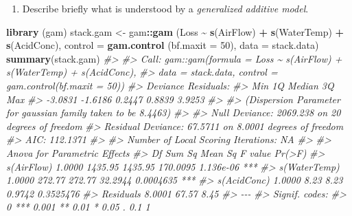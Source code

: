 \documentclass[
]{book}
\newenvironment{Shaded}{\begin{snugshade}}{\end{snugshade}}
\newcommand{\AttributeTok}[1]{\textcolor[rgb]{0.13,0.29,0.53}{#1}}
\newcommand{\CommentTok}[1]{\textcolor[rgb]{0.56,0.35,0.01}{\textit{#1}}}
\newcommand{\DecValTok}[1]{\textcolor[rgb]{0.00,0.00,0.81}{#1}}
\newcommand{\FunctionTok}[1]{\textcolor[rgb]{0.13,0.29,0.53}{\textbf{#1}}}
\newcommand{\NormalTok}[1]{#1}
\newcommand{\OtherTok}[1]{\textcolor[rgb]{0.56,0.35,0.01}{#1}}
\newcommand{\SpecialCharTok}[1]{\textcolor[rgb]{0.81,0.36,0.00}{\textbf{#1}}}
\providecommand{\tightlist}{%
  \setlength{\itemsep}{0pt}\setlength{\parskip}{0pt}}
\begin{document}
\begin{enumerate}
\def\labelenumi{(\alph{enumi})}
\tightlist
\item
  Describe briefly what is understood by a \emph{{generalized additive model}}.
\end{enumerate}

\begin{Shaded}
\begin{Highlighting}[]
\FunctionTok{library}\NormalTok{ (gam) }
\NormalTok{stack.gam }\OtherTok{\textless{}{-}}\NormalTok{ gam}\SpecialCharTok{::}\FunctionTok{gam}\NormalTok{ (Loss }\SpecialCharTok{\textasciitilde{}} \FunctionTok{s}\NormalTok{(AirFlow) }\SpecialCharTok{+} \FunctionTok{s}\NormalTok{(WaterTemp) }\SpecialCharTok{+} \FunctionTok{s}\NormalTok{(AcidConc),}
                       \AttributeTok{control =} \FunctionTok{gam.control}\NormalTok{ (}\AttributeTok{bf.maxit =} \DecValTok{50}\NormalTok{), }\AttributeTok{data =}\NormalTok{ stack.data)}
\FunctionTok{summary}\NormalTok{(stack.gam)}
\CommentTok{\#\textgreater{} }
\CommentTok{\#\textgreater{} Call: gam::gam(formula = Loss \textasciitilde{} s(AirFlow) + s(WaterTemp) + s(AcidConc), }
\CommentTok{\#\textgreater{}     data = stack.data, control = gam.control(bf.maxit = 50))}
\CommentTok{\#\textgreater{} Deviance Residuals:}
\CommentTok{\#\textgreater{}     Min      1Q  Median      3Q     Max }
\CommentTok{\#\textgreater{} {-}3.0831 {-}1.6186  0.2447  0.8839  3.9253 }
\CommentTok{\#\textgreater{} }
\CommentTok{\#\textgreater{} (Dispersion Parameter for gaussian family taken to be 8.4463)}
\CommentTok{\#\textgreater{} }
\CommentTok{\#\textgreater{}     Null Deviance: 2069.238 on 20 degrees of freedom}
\CommentTok{\#\textgreater{} Residual Deviance: 67.5711 on 8.0001 degrees of freedom}
\CommentTok{\#\textgreater{} AIC: 112.1371 }
\CommentTok{\#\textgreater{} }
\CommentTok{\#\textgreater{} Number of Local Scoring Iterations: NA }
\CommentTok{\#\textgreater{} }
\CommentTok{\#\textgreater{} Anova for Parametric Effects}
\CommentTok{\#\textgreater{}                  Df  Sum Sq Mean Sq  F value    Pr(\textgreater{}F)    }
\CommentTok{\#\textgreater{} s(AirFlow)   1.0000 1435.95 1435.95 170.0095 1.136e{-}06 ***}
\CommentTok{\#\textgreater{} s(WaterTemp) 1.0000  272.77  272.77  32.2944 0.0004635 ***}
\CommentTok{\#\textgreater{} s(AcidConc)  1.0000    8.23    8.23   0.9742 0.3525476    }
\CommentTok{\#\textgreater{} Residuals    8.0001   67.57    8.45                       }
\CommentTok{\#\textgreater{} {-}{-}{-}}
\CommentTok{\#\textgreater{} Signif. codes:  }
\CommentTok{\#\textgreater{} 0 \textquotesingle{}***\textquotesingle{} 0.001 \textquotesingle{}**\textquotesingle{} 0.01 \textquotesingle{}*\textquotesingle{} 0.05 \textquotesingle{}.\textquotesingle{} 0.1 \textquotesingle{} \textquotesingle{} 1}

\end{Highlighting}
\end{Shaded}
\end{document}

